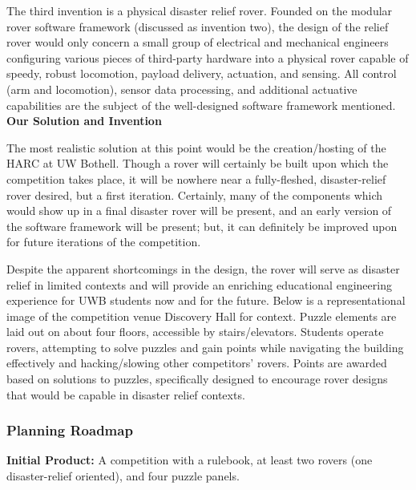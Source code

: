 \documentclass[a4paper, 10pt]{article}
\begin{document}
The third invention is a physical disaster relief rover. Founded on the modular rover software framework (discussed as invention two), the design of the relief rover would only concern a small group of electrical and mechanical engineers configuring various pieces of third-party hardware into a physical rover capable of speedy, robust locomotion, payload delivery, actuation, and sensing. All control (arm and locomotion), sensor data processing, and additional actuative capabilities are the subject of the well-designed software framework mentioned. \\

\textbf{Our Solution and Invention}

The most realistic solution at this point would be the creation/hosting of the HARC at UW Bothell. Though a rover will certainly be built upon which the competition takes place, it will be nowhere near a fully-fleshed, disaster-relief rover desired, but a first iteration. Certainly, many of the components which would show up in a final disaster rover will be present, and an early version of the software framework will be present; but, it can definitely be improved upon for future iterations of the competition.
	
	Despite the apparent shortcomings in the design, the rover will serve as disaster relief in limited contexts and will provide an enriching educational engineering experience for UWB students now and for the future. Below is a representational image of the competition venue Discovery Hall for context. Puzzle elements are laid out on about four floors, accessible by stairs/elevators. Students operate rovers, attempting to solve puzzles and gain points while navigating the building effectively and hacking/slowing other competitors' rovers. Points are awarded based on solutions to puzzles, specifically designed to encourage rover designs that would be capable in disaster relief contexts.
	
		\subsubsection{Planning Roadmap}
		\textbf{Initial Product:} A competition with a rulebook, at least two rovers (one disaster-relief oriented), and four puzzle panels.
		
\end{document}
